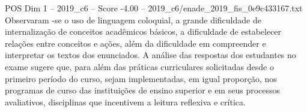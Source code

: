 \begin{textsample}{POS Dim 1 – 2019\_c6 – Score -4.00 – 2019\_c6/enade\_2019\_fis\_0e9c433167.txt}
Observaram -se o uso de linguagem coloquial, a grande dificuldade de internalização de conceitos acadêmicos básicos, a dificuldade de estabelecer relações entre conceitos e ações, além da dificuldade em compreender e interpretar os textos dos enunciados.
A análise das respostas dos estudantes no exame sugere que, para além das práticas curriculares solicitadas desde o primeiro período do curso, sejam implementadas, em igual proporção, nos programas de curso das instituições de ensino superior e em seus processos avaliativos, disciplinas que incentivem a leitura reflexiva e crítica.

\end{textsample}
